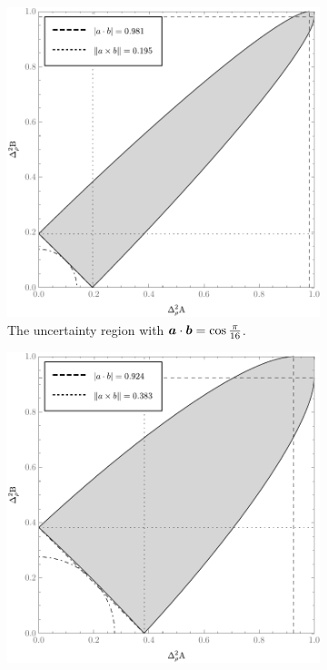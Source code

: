 \begin{figure}[H]
  \begin{subfigure}[t]{0.38\textwidth}\centering
    \includegraphics[width=\textwidth]{figs/new-qubit-error-region-with-upper-and-lower-bounds-pi-by-16-bw}
    \caption{The uncertainty region with $\bm{a}\cdot\bm{b} = \cos\frac{\pi}{16}$.}
    \label{fig:err-region-pi-by-16}
  \end{subfigure}\hfill
  \begin{subfigure}[t]{0.38\textwidth}\centering
    \includegraphics[width=\textwidth]{figs/new-qubit-error-region-with-upper-and-lower-bounds-pi-by-8-bw}

\end{subfigure}
\end{figure}

